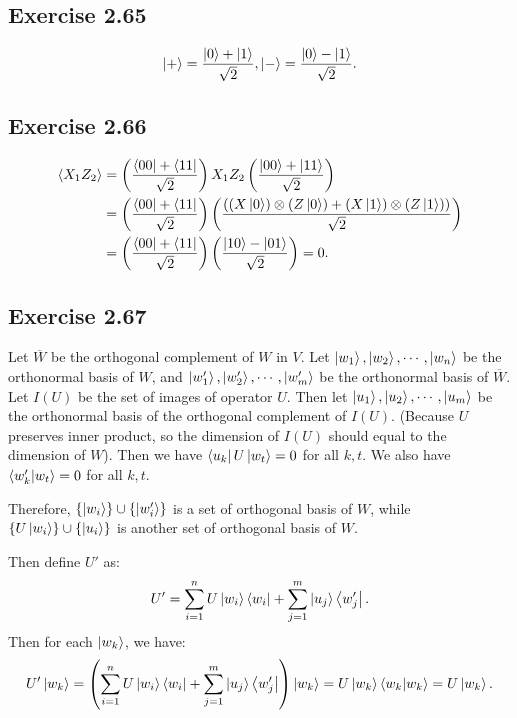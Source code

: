 \subsection*{Exercise 2.65}

\begin{align}
\ket{+}=\frac{\ket{0}+\ket{1}}{\sqrt 2},\ket{-}=\frac{\ket{0}-\ket{1}}{\sqrt 2}.
\end{align}

\subsection*{Exercise 2.66}

\begin{align}
\langle X_1Z_2\rangle &= \left(\frac{\bra{00}+\bra{11}}{\sqrt 2}\right)X_1Z_2\left(\frac{\ket{00}+\ket{11}}{\sqrt 2}\right)\\
&=\left(\frac{\bra{00}+\bra{11}}{\sqrt 2}\right)\left(\frac{((X\ket{0})\otimes (Z\ket{0})+(X\ket{1})\otimes (Z\ket{1}))}{\sqrt 2}\right)\\
&=\left(\frac{\bra{00}+\bra{11}}{\sqrt 2}\right)\left(\frac{\ket{10}-\ket{01}}{\sqrt 2}\right)=0.
\end{align}

\subsection*{Exercise 2.67}

Let $\overline W$ be the orthogonal complement of $W$ in $V$. Let $\ket{w_1},\ket{w_2},\cdots,\ket{w_n}$ be the orthonormal basis of $W$, and $\ket{w_1'},\ket{w_2'},\cdots,\ket{w_m'}$ be the orthonormal basis of $\overline{W}$. Let $I(U)$ be the set of images of operator $U$. Then let $\ket{u_1},\ket{u_2},\cdots,\ket{u_m}$ be the orthonormal basis of the orthogonal complement of $I(U)$. (Because $U$ preserves inner product, so the dimension of $I(U)$ should equal to the dimension of $W$). Then we have $\bra{u_k}U\ket{w_t}=0$ for all $k,t$. We also have $\bra{w'_k}\ket{w_t}=0$ for all $k,t$.

Therefore, $\{\ket{w_i}\} \cup \{\ket{w'_i}\}$ is a set of orthogonal basis of $W$, while $\{U\ket{w_i}\} \cup \{\ket{u_i}\}$ is another set of orthogonal basis of $W$.

Then define $U'$ as:
\begin{align}
 U'=\sum_{i=1}^n U\ket{w_i}\bra{w_i}+\sum_{j=1}^m \ket{u_j}\bra{w_j'}.
\end{align}
Then for each $\ket{w_k}$, we have:
\begin{align}
U'\ket{w_k}=\left(\sum_{i=1}^n U\ket{w_i}\bra{w_i}+\sum_{j=1}^m \ket{u_j}\bra{w_j'}\right)\ket{w_k}=U\ket{w_k}\bra{w_k}\ket{w_k}=U\ket{w_k}.
\end{align}

